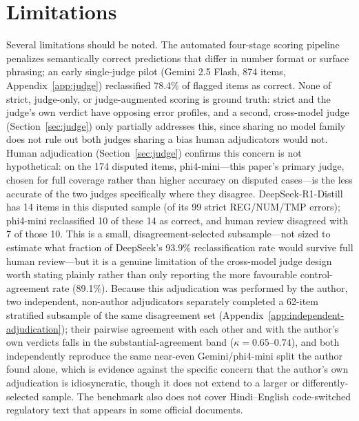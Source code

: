 
\section*{Limitations}
\label{sec:limitations}

Several limitations should be noted. The automated four-stage scoring pipeline penalizes
semantically correct predictions that differ in number format or surface phrasing; an early
single-judge pilot (Gemini 2.5 Flash, 874 items, Appendix~\ref{app:judge}) reclassified 78.4\% of
flagged items as correct. None of strict,
judge-only, or judge-augmented scoring is ground truth: strict and the judge's own verdict have
opposing error profiles, and a second, cross-model
judge (Section~\ref{sec:judge}) only partially addresses this, since sharing no model family does not
rule out both judges sharing a bias human adjudicators would not. Human adjudication
(Section~\ref{sec:judge}) confirms this concern is not hypothetical: on the 174 disputed items,
phi4-mini---this paper's primary judge, chosen for full coverage rather than higher accuracy on
disputed cases---is the less accurate of the two judges specifically where they disagree.
DeepSeek-R1-Distill has 14 items in this disputed sample (of its 99 strict REG/NUM/TMP errors);
phi4-mini reclassified 10 of these 14 as correct, and human review disagreed with 7 of those 10. This
is a small, disagreement-selected subsample---not sized to estimate what fraction of DeepSeek's
93.9\% reclassification rate would survive full human review---but it is a genuine limitation of the
cross-model judge design worth stating plainly rather than only reporting the more favourable
control-agreement rate (89.1\%). Because this adjudication was performed by the author, two
independent, non-author adjudicators separately completed a 62-item stratified subsample of the same
disagreement set (Appendix~\ref{app:independent-adjudication}); their pairwise agreement with each
other and with the author's own verdicts falls in the substantial-agreement band ($\kappa=0.65$--$0.74$),
and both independently reproduce the same near-even Gemini/phi4-mini split the author found alone,
which is evidence against the specific concern that the author's own adjudication is idiosyncratic,
though it does not extend to a larger or differently-selected sample. The benchmark also does not
cover Hindi--English code-switched regulatory text that appears in some official documents.

